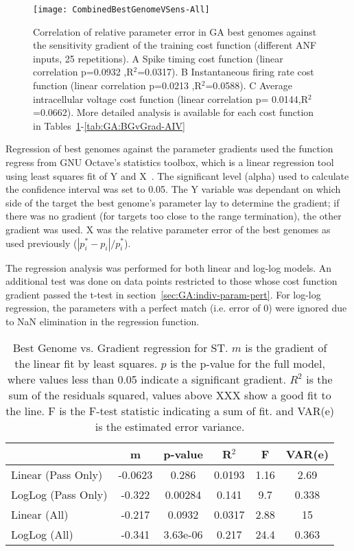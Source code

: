 \begin{figure}[th]
  \centering
  \texttt{[image: CombinedBestGenomeVSens-All]}  
  \caption{Correlation of relative parameter error in GA best genomes
    against the sensitivity gradient of the training cost function
    (different ANF inputs, 25 repetitions). A Spike timing cost
    function (linear correlation p=0.0932 ,R$^2$=0.0317). B
    Instantaneous firing rate cost function (linear correlation
    p=0.0213 ,R$^2$=0.0588).  C Average intracellular voltage cost
    function (linear correlation p= 0.0144,R$^2$=0.0662).  More
    detailed analysis is available for each cost function in
    Tables~\ref{tab:GA:BGvGrad-ST}-\ref{tab:GA:BGvGrad-AIV}}
  \label{fig:GA:BestGenomeVGradient}
\end{figure}
% 

Regression of best genomes against the parameter gradients used the
function \textsf{regress} from GNU Octave's \textsf{statistics}
toolbox, which is a linear regression tool using least squares fit of
Y and X~\citep{Eaton:2002}. The significant level (alpha) used to
calculate the confidence interval was set to 0.05. The Y variable was
dependant on which side of the target the best genome's parameter lay
to determine the gradient; if there was no gradient (for targets too
close to the range termination), the other gradient was used. X was
the relative parameter error of the best genomes as used previously
($\left|p^\ast_i-{p}_i\right|/p^\ast_i$).

The regression analysis was performed for both linear and log-log
models. An additional test was done on data points restricted to those
whose cost function gradient passed the t-test in
section~\ref{sec:GA:indiv-param-pert}. For log-log regression, the
parameters with a perfect match (i.e. error of 0) were ignored due to
NaN elimination in the regression function.

\smallskip{}

\begin{table}[th]
  \centering
  \begin{tabular}{lccccc}
\toprule
                   &    m    & p-value  & R$^2$ &  F  & VAR(e) \\[1ex] \midrule
Linear (Pass Only) & -0.0623 &  0.286   & 0.0193& 1.16& 2.69   \\
LogLog (Pass Only) & -0.322  & 0.00284  & 0.141 & 9.7 & 0.338 \\[0.5ex] \hline
   Linear (All)    & -0.217  &  0.0932  & 0.0317& 2.88& 15     \\
   LogLog (All)    & -0.341  & 3.63e-06 & 0.217 & 24.4& 0.363 \\[1ex] \hline    
 \end{tabular}
 \caption{Best Genome vs. Gradient regression for ST. $m$ is the gradient of the    linear fit by least squares. $p$ is the p-value for the full model, where values  less than 0.05 indicate a significant gradient. $R^2$ is the sum of the residuals  squared, values above XXX show a good fit to the line.  F is the F-test statistic  indicating a sum of fit.  and VAR(e) is the estimated error variance.  }
  \label{tab:GA:BGvGrad-ST}
\end{table}


